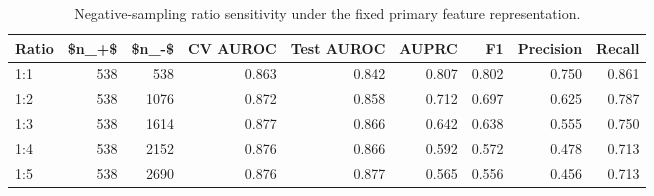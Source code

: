 \begin{table}[htbp]
\centering
\caption{Negative-sampling ratio sensitivity under the fixed primary feature representation.}
\label{tab:robustness_recomputed}
\begin{tabular}{lrrrrrrrr}
\toprule
Ratio & \$n\_+\$ & \$n\_-\$ & CV AUROC & Test AUROC & AUPRC & F1 & Precision & Recall \\
\midrule
1:1 & 538 & 538 & 0.863 & 0.842 & 0.807 & 0.802 & 0.750 & 0.861 \\
1:2 & 538 & 1076 & 0.872 & 0.858 & 0.712 & 0.697 & 0.625 & 0.787 \\
1:3 & 538 & 1614 & 0.877 & 0.866 & 0.642 & 0.638 & 0.555 & 0.750 \\
1:4 & 538 & 2152 & 0.876 & 0.866 & 0.592 & 0.572 & 0.478 & 0.713 \\
1:5 & 538 & 2690 & 0.876 & 0.877 & 0.565 & 0.556 & 0.456 & 0.713 \\
\bottomrule
\end{tabular}

\end{table}
